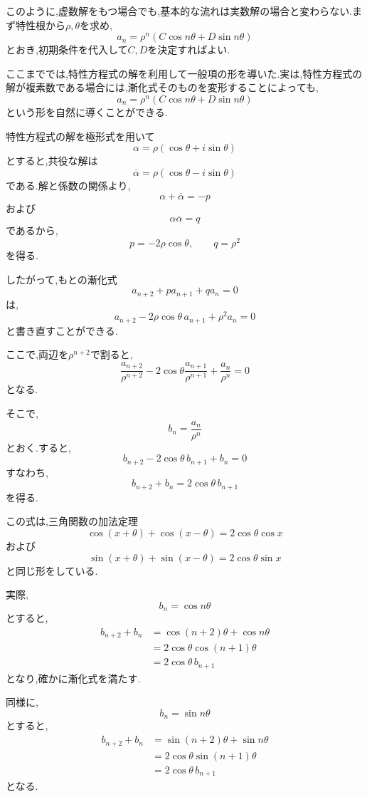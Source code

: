   このように,虚数解をもつ場合でも,基本的な流れは実数解の場合と変わらない.まず特性根から$\rho,\theta$を求め,
  \[
    a_n=\rho^n(C\cos n\theta+D\sin n\theta)
  \]
  とおき,初期条件を代入して$C,D$を決定すればよい.

  ここまででは,特性方程式の解を利用して一般項の形を導いた.実は,特性方程式の解が複素数である場合には,漸化式そのものを変形することによっても,
  \[
    a_n=\rho^n(C\cos n\theta+D\sin n\theta)
  \]
  という形を自然に導くことができる.

  特性方程式の解を極形式を用いて
  \[
    \alpha=\rho(\cos\theta+i\sin\theta)
  \]
  とすると,共役な解は
  \[
    \overline{\alpha}
    =\rho(\cos\theta-i\sin\theta)
  \]
  である.解と係数の関係より,
  \[
    \alpha+\overline{\alpha}=-p
  \]
  および
  \[
    \alpha\overline{\alpha}=q
  \]
  であるから,
  \[
    p=-2\rho\cos\theta,\qquad
    q=\rho^2
  \]
  を得る.

  したがって,もとの漸化式
  \[
    a_{n+2}+pa_{n+1}+qa_n=0
  \]
  は,
  \[
    a_{n+2}
    -2\rho\cos\theta\,a_{n+1}
    +\rho^2a_n=0
  \]
  と書き直すことができる.

  ここで,両辺を$\rho^{n+2}$で割ると,
  \[
    \frac{a_{n+2}}{\rho^{n+2}}
    -2\cos\theta
    \frac{a_{n+1}}{\rho^{n+1}}
    +\frac{a_n}{\rho^n}
    =0
  \]
  となる.

  そこで,
  \[
    b_n=\frac{a_n}{\rho^n}
  \]
  とおく.すると,
  \[
    b_{n+2}
    -2\cos\theta\,b_{n+1}
    +b_n=0
  \]
  すなわち,
  \[
    b_{n+2}+b_n
    =2\cos\theta\,b_{n+1}
  \]
  を得る.

  この式は,三角関数の加法定理
  \[
    \cos(x+\theta)+\cos(x-\theta)
    =2\cos\theta\cos x
  \]
  および
  \[
    \sin(x+\theta)+\sin(x-\theta)
    =2\cos\theta\sin x
  \]
  と同じ形をしている.

  実際,
  \[
    b_n=\cos n\theta
  \]
  とすると,
  \[
  \begin{aligned}
    b_{n+2}+b_n
    &=
    \cos(n+2)\theta+\cos n\theta
  \\
    &=
    2\cos\theta\cos(n+1)\theta
  \\
    &=
    2\cos\theta\,b_{n+1}
  \end{aligned}
  \]
  となり,確かに漸化式を満たす.

  同様に,
  \[
    b_n=\sin n\theta
  \]
  とすると,
  \[
  \begin{aligned}
    b_{n+2}+b_n
    &=
    \sin(n+2)\theta+\sin n\theta
  \\
    &=
    2\cos\theta\sin(n+1)\theta
  \\
    &=
    2\cos\theta\,b_{n+1}
  \end{aligned}
  \]
  となる.

